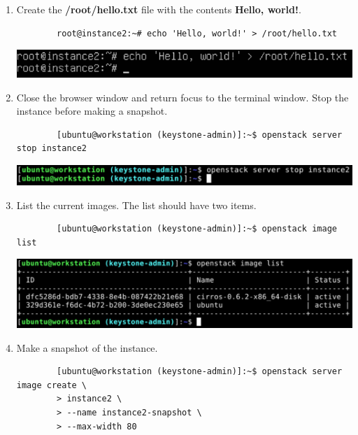 \documentclass[letterpaper, 12pt]{article}
\begin{document}
\begin{enumerate}
    \item Create the \textbf{/root/hello.txt} file with the contents \textbf{Hello, world!}.
    \begin{lstlisting}
        root@instance2:~# echo 'Hello, world!' > /root/hello.txt
    \end{lstlisting}

    \begin{center}
        \includegraphics[width=\linewidth]{images/part2/step7.png}
    \end{center}

    \item Close the browser window and return focus to the terminal window.
    Stop the instance before making a snapshot.
    \begin{lstlisting}
        [ubuntu@workstation (keystone-admin)]:~$ openstack server stop instance2
    \end{lstlisting}

    \begin{center}
        \includegraphics[width=\linewidth]{images/part2/step8.png}
    \end{center}

    \item List the current images.
    The list should have two items.
    \begin{lstlisting}
        [ubuntu@workstation (keystone-admin)]:~$ openstack image list
    \end{lstlisting}

    \begin{center}
        \includegraphics[width=\linewidth]{images/part2/step9.png}
    \end{center}

    \item Make a snapshot of the instance.
    \begin{lstlisting}
        [ubuntu@workstation (keystone-admin)]:~$ openstack server image create \
        > instance2 \
        > --name instance2-snapshot \
        > --max-width 80
    \end{lstlisting}


\end{enumerate}
\end{document}
